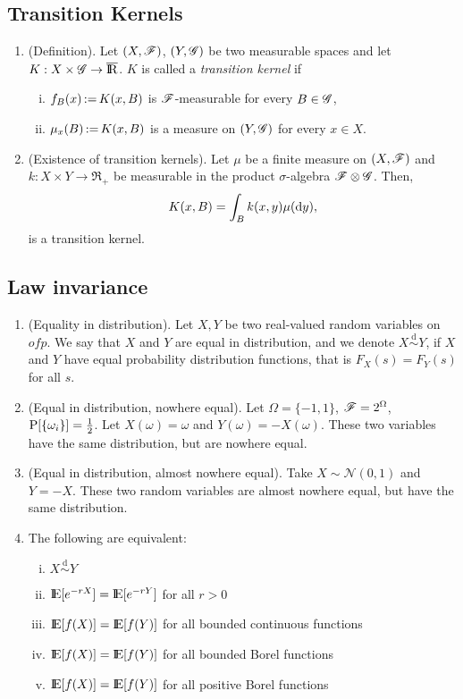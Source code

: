 \documentclass[a4paper,10pt]{article}
\begin{document}
\subsection{Transition Kernels}
\begin{enumerate}
 \item (Definition). Let $(X,\mathscr{F})$, $(Y,\mathscr{G})$ be two measurable spaces and let $K:X\times \G\to\barre$.
       $K$ is called a \textit{transition kernel} if
       \begin{enumerate}[i.]
        \item $f_B(x) {}\mathop{\mathrel{:}=}{} K(x,B)$ is $\mathscr{F}$-measurable for every $B\in\mathscr{G}$,
        \item $\mu_x(B) {}\mathop{\mathrel{:}=}{} K(x,B)$ is a measure on $(Y,\mathscr{G})$ for every $x\in X$.
       \end{enumerate}
 \item (Existence of transition kernels). Let $\mu$ be a finite measure on $(X,\mathscr{F})$ and $k:X\times Y\to\Re_+$
       be measurable in the product $\sigma$-algebra $\mathscr{F}\otimes \mathscr{G}$. Then,
       \[
        K(x,B) = \int_B k(x,y) \mu(\mathrm{d} y),
       \]
       is a transition kernel.
\end{enumerate}

\subsection{Law invariance}
\begin{enumerate}
 \item (Equality in distribution). 
      Let $X,Y$ be two real-valued random variables on $ofp$.
      We say that $X$ and $Y$ are equal in distribution, and we denote $X\overset{\mathrm{d}}{\sim} Y$,
      if $X$ and $Y$ have equal probability distribution functions, that is $F_X(s) = F_Y(s)$ for all $s$.

 \item (Equal in distribution, nowhere equal). Let $\Omega = \{-1,1\}$, $\mathscr{F}=2^\Omega$, $\mathrm{P}[\{\omega_i\}]=\frac{1}{2}$.
       Let $X(\omega) = \omega$ and $Y(\omega) = -X(\omega)$. These two variables have the same distribution, but 
       are nowhere equal.
 
 \item (Equal in distribution, almost nowhere equal). Take $X\sim \mathcal{N}(0,1)$ and $Y=-X$. These 
       two random variables are almost nowhere equal, but have the same distribution.
       
 \item The following are equivalent:
      \begin{enumerate}[(i)]
       \item $X\overset{\mathrm{d}}{\sim} Y$
       \item $\E[e^{-rX}]=\E[e^{-rY}]$ for all $r>0$
       \item $\E[f(X)] = \E[f(Y)]$ for all bounded continuous functions
       \item $\E[f(X)] = \E[f(Y)]$ for all bounded Borel functions
       \item $\E[f(X)] = \E[f(Y)]$ for all positive Borel functions	
      \end{enumerate}

 
 
\end{enumerate}
\end{document}
